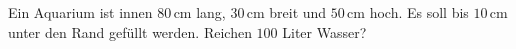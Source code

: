 \documentclass[11pt]{article}
\makeatletter
\newcommand{\aufg}[3]{\par\noindent\makebox[0pt][r]{#3}\begin{minipage}[t]{\linewidth}#1\end{minipage}\par}
\newcommand{\nr}[1]{\makebox[7mm][l]{\textbf{#1}}}
\newlength{\kr}
\newcommand{\karomerk}[2]{\protected@write\@auxout{}{\string\karoseite{#1}{#2}{\thepage}}}
\newcommand{\karoseite}[3]{\expandafter\xdef\csname karo@#1@#2\endcsname{#3}}
\makeatother
\begin{document}
\medskip
\aufg{\nr{5.}Ein Aquarium ist innen $80$\,cm lang, $30$\,cm breit und $50$\,cm hoch. Es soll bis $10$\,cm unter den Rand gefüllt werden. Reichen $100$ Liter Wasser?}{}{{\scriptsize\color{mbgrau}Ziel\hspace{2mm}}}
\medskip
\par\vspace{3mm}\setlength{\kr}{\dimexpr\pagegoal-\pagetotal-10mm\relax}%
\ifdim\kr>12mm\karomerk{k}{T}\noindent{\scriptsize\color{mbgrau}Platz zum Rechnen}\par\nointerlineskip\vspace{1mm}\noindent
\begin{tikzpicture}\clip (0,0) rectangle ({\linewidth-0.5mm},\kr);\draw[black!16,line width=0.3pt,step=5mm] (0,0) grid (\linewidth,\kr);\end{tikzpicture}\fi\par
\end{document}
